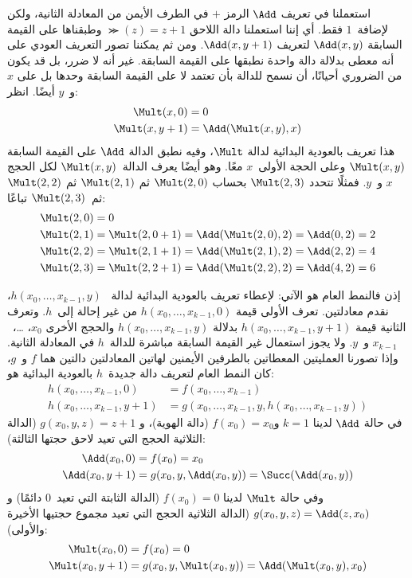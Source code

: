 \documentclass[../../../include/open-logic-section]{subfiles}
\begin{document}
استعملنا في تعريف $\Add$ الرمز $+$ في الطرف الأيمن من المعادلة
الثانية، ولكن لإضافة~$1$ فقط. أي إننا استعملنا دالة اللاحق
$\Succ(z)=z+1$ وطبقناها على القيمة السابقة $\Add(x,y)$ لتعريف
$\Add(x,y+1)$. ومن ثم يمكننا تصور التعريف العودي على أنه معطى بدلالة
دالة واحدة نطبقها على القيمة السابقة. غير أنه لا ضرر، بل قد يكون من
الضروري أحيانًا، أن نسمح للدالة بأن تعتمد لا على القيمة السابقة وحدها
بل على $x$ و~$y$ أيضًا. انظر:
\begin{align*}
  \Mult(x,0) & =  0 \\
  \Mult(x,y+1) & =  \Add(\Mult(x,y),x)
\end{align*}
هذا تعريف بالعودية البدائية لدالة $\Mult$، وفيه نطبق الدالة $\Add$ على
القيمة السابقة $\Mult(x,y)$ وعلى الحجة الأولى~$x$ معًا. وهو أيضًا
يعرف الدالة~$\Mult(x,y)$ لكل الحجج $x$ و~$y$. فمثلًا تتحدد
$\Mult(2,3)$ بحساب $\Mult(2,0)$ ثم $\Mult(2,1)$ ثم $\Mult(2,2)$
ثم~$\Mult(2,3)$ تباعًا:
\begin{align*}
  \Mult(2,0) & = 0\\
  \Mult(2,1) & = \Mult(2,0+1) =
  \Add(\Mult(2,0), 2) = \Add(0, 2) = 2\\
  \Mult(2,2) & = \Mult(2,1+1) =
  \Add(\Mult(2,1), 2) = \Add(2, 2) = 4\\
  \Mult(2,3) & = \Mult(2,2+1) =
  \Add(\Mult(2,2), 2) = \Add(4, 2) = 6
\end{align*}

إذن فالنمط العام هو الآتي: لإعطاء تعريف بالعودية البدائية لدالة
~$h(x_0,\dots,x_{k-1},y)$، نقدم معادلتين. تعرف الأولى قيمة
$h(x_0,\dots,x_{k-1},0)$ من غير إحالة إلى~$h$. وتعرف الثانية قيمة
$h(x_0,\dots,x_{k-1},y+1)$ بدلالة $h(x_0,\dots,x_{k-1},y)$ والحجج
الأخرى $x_0$، …،~$x_{k-1}$ و~$y$. ولا يجوز استعمال غير القيمة السابقة
مباشرة للدالة~$h$ في المعادلة الثانية. وإذا تصورنا العمليتين المعطاتين
بالطرفين الأيمنين لهاتين المعادلتين دالتين هما $f$ و~$g$، كان النمط العام
لتعريف دالة جديدة~$h$ بالعودية البدائية هو:
\begin{align*}
  h(x_0, \dots, x_{k-1}, 0) & = f(x_0, \dots, x_{k-1})\\
  h(x_0, \dots, x_{k-1}, y+1) & =
  g(x_0, \dots, x_{k-1}, y, h(x_0, \dots, x_{k-1}, y))
\end{align*}
في حالة $\Add$ لدينا $k=1$ و$f(x_0)=x_0$ (دالة الهوية)، و
$g(x_0,y,z)=z+1$ (الدالة الثلاثية الحجج التي تعيد لاحق حجتها الثالثة):
\begin{align*}
  \Add(x_0, 0) & = f(x_0) = x_0\\
  \Add(x_0, y+1) & = g(x_0, y, \Add(x_0, y)) =
  \Succ(\Add(x_0, y))
\end{align*}
وفي حالة $\Mult$ لدينا $f(x_0)=0$ (الدالة الثابتة التي تعيد~$0$
دائمًا) و$g(x_0,y,z)=\Add(z,x_0)$ (الدالة الثلاثية الحجج التي تعيد
مجموع حجتيها الأخيرة والأولى):
\begin{align*}
  \Mult(x_0,0) & =  f(x_0) = 0 \\
  \Mult(x_0,y+1) & =  g(x_0, y, \Mult(x_0,y)) =
  \Add(\Mult(x_0,y), x_0)
\end{align*}
\end{document}
